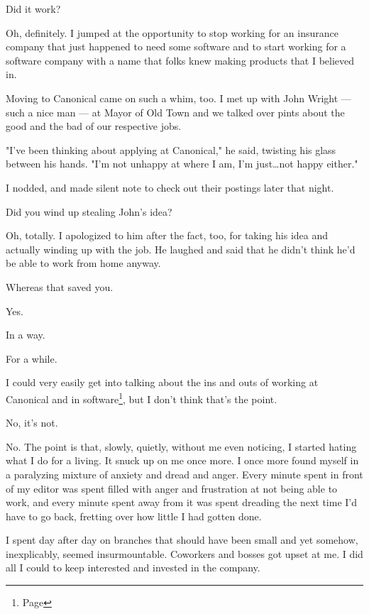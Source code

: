 \begin{paracol}{2}
\begin{leftcolumn}
\begin{ally}
Did it work?
\end{ally}
Oh, definitely. I jumped at the opportunity to stop working for an insurance company that just happened to need some software and to start working for a software company with a name that folks knew making products that I believed in.

Moving to Canonical came on such a whim, too. I met up with John Wright --- such a nice man --- at Mayor of Old Town and we talked over pints about the good and the bad of our respective jobs.

"I've been thinking about applying at Canonical," he said, twisting his glass between his hands. "I'm not unhappy at where I am, I'm just\ldots{}not happy either."

I nodded, and made silent note to check out their postings later that night.

\begin{ally}
Did you wind up stealing John's idea?
\end{ally}
Oh, totally. I apologized to him after the fact, too, for taking his idea and actually winding up with the job. He laughed and said that he didn't think he'd be able to work from home anyway.

\begin{ally}
Whereas that saved you.
\end{ally}
Yes.

In a way.

For a while.

\newpage

\noindent I could very easily get into talking about the ins and outs of working at Canonical and in software\footnote{Page \pageref{writing:software}}, but I don't think that's the point.

\begin{ally}
No, it's not.
\end{ally}
No. The point is that, slowly, quietly, without me even noticing, I started hating what I do for a living. It snuck up on me once more. I once more found myself in a paralyzing mixture of anxiety and dread and anger. Every minute spent in front of my editor was spent filled with anger and frustration at not being able to work, and every minute spent away from it was spent dreading the next time I'd have to go back, fretting over how little I had gotten done.

I spent day after day on branches that should have been small and yet somehow, inexplicably, seemed insurmountable. Coworkers and bosses got upset at me. I did all I could to keep interested and invested in the company.


\end{leftcolumn}
\end{paracol}
